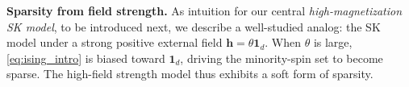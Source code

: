 \documentclass[11pt]{article}
\newcommand{\norms}[1]{\lVert#1\rVert}
\newcommand{\R}{\mathbb{R}}
\newcommand{\1}{\mathbf{1}}
\newcommand{\0}{\mathbf{0}}
\newcommand{\rd}{\color{red}}
\newcommand{\bk}{\color{black}}
\newcommand{\vth}{\boldsymbol{\theta}}
\newcommand{\vxi}{\boldsymbol{\xi}}
\newcommand{\vths}{\vth^\star}
\newcommand{\mx}{{\mathbf{X}}}
\newcommand{\vy}{{\mathbf{y}}}
\begin{document}





\textbf{Sparsity from field strength.} As intuition for our central \emph{high-magnetization SK model}, to be introduced next, we describe a well-studied analog: the SK model under a strong positive external
field
\(  \mathbf{h}=\theta \mathbf{1}_d
\).
When $\theta$ is large,
\eqref{eq:ising_intro} is biased toward $\1_d$, driving the minority-spin set to become sparse.  The high-field strength model thus exhibits a soft form of sparsity. 
\end{document}
